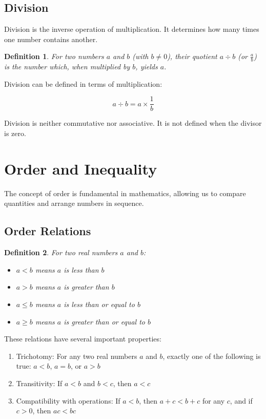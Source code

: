 \documentclass[12pt,a4paper]{article}
\newtheorem{definition}{Definition}
\begin{document}
\subsection{Division}

Division is the inverse operation of multiplication. It determines how many times one number contains another.

\begin{definition}
For two numbers $a$ and $b$ (with $b \neq 0$), their quotient $a \div b$ (or $\frac{a}{b}$) is the number which, when multiplied by $b$, yields $a$.
\end{definition}

Division can be defined in terms of multiplication:

\[ a \div b = a \times \frac{1}{b} \]

Division is neither commutative nor associative. It is not defined when the divisor is zero.

\section{Order and Inequality}

The concept of order is fundamental in mathematics, allowing us to compare quantities and arrange numbers in sequence.

\subsection{Order Relations}

\begin{definition}
For two real numbers $a$ and $b$:
\begin{itemize}
    \item $a < b$ means $a$ is less than $b$
    \item $a > b$ means $a$ is greater than $b$
    \item $a \leq b$ means $a$ is less than or equal to $b$
    \item $a \geq b$ means $a$ is greater than or equal to $b$
\end{itemize}
\end{definition}

These relations have several important properties:

\begin{enumerate}
    \item Trichotomy: For any two real numbers $a$ and $b$, exactly one of the following is true: $a < b$, $a = b$, or $a > b$
    \item Transitivity: If $a < b$ and $b < c$, then $a < c$
    \item Compatibility with operations: If $a < b$, then $a + c < b + c$ for any $c$, and if $c > 0$, then $ac < bc$
\end{enumerate}
\end{document}
